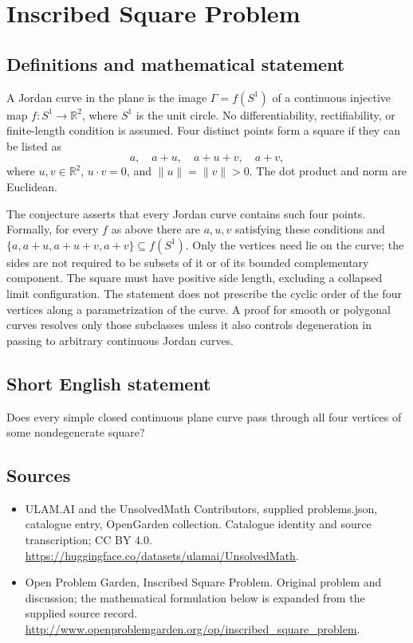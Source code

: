 \documentclass[11pt,a4paper]{article}
\begin{document}
\section*{Inscribed Square Problem}\label{statement}

\subsection{Definitions and mathematical statement}
A Jordan curve in the plane is the image $\Gamma=f(S^1)$ of a
continuous injective map $f:S^1\to\mathbb R^2$, where $S^1$ is the
unit circle. No differentiability, rectifiability, or finite-length
condition is assumed. Four distinct points form a square if they
can be listed as
\[
             a,\quad a+u,\quad a+u+v,\quad a+v,
\]
where $u,v\in\mathbb R^2$, $u\cdot v=0$, and
$\|u\|=\|v\|>0$. The dot product and norm are Euclidean.

The conjecture asserts that every Jordan curve contains such four
points. Formally, for every $f$ as above there are $a,u,v$ satisfying
these conditions and
$\{a,a+u,a+u+v,a+v\}\subseteq f(S^1)$. Only the vertices need lie
on the curve; the sides are not required to be subsets of it or
of its bounded complementary component.
The square must have positive side length, excluding a collapsed
limit configuration. The statement does not prescribe the cyclic
order of the four vertices along a parametrization of the curve.
A proof for smooth or polygonal curves resolves only those
subclasses unless it also controls degeneration in passing to
arbitrary continuous Jordan curves.
\subsection{Short English statement}
Does every simple closed continuous plane curve pass through all four vertices of some nondegenerate square?
\subsection{Sources}
\begin{itemize}
\item[S1] ULAM.AI and the UnsolvedMath Contributors, supplied problems.json, catalogue entry, OpenGarden collection. Catalogue identity and source transcription; CC BY 4.0.
\url{https://huggingface.co/datasets/ulamai/UnsolvedMath}.
\item[S2] Open Problem Garden, Inscribed Square Problem. Original problem and discussion; the mathematical formulation below is expanded from the supplied source record.
\url{http://www.openproblemgarden.org/op/inscribed_square_problem}.
\end{itemize}
\end{document}
